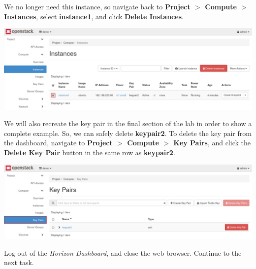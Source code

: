 \documentclass[letterpaper, 12pt]{article}
\begin{document}
\begin{enumerate}
    \begin{labstep}
        We no longer need this instance, so navigate back to \textbf{Project $>$ Compute $>$ Instances}, select \textbf{instance1}, and click \textbf{Delete Instances}.

        \begin{center}
            \includegraphics[width=\linewidth]{images/part8/step14.png}
        \end{center}
    \end{labstep}

    \begin{labstep}
        We will also recreate the key pair in the final section of the lab in order to show a complete example.
        So, we can safely delete \textbf{keypair2}.
        To delete the key pair from the dashboard, navigate to \textbf{Project $>$ Compute $>$ Key Pairs}, and click the \textbf{Delete Key Pair} button in the same row as \textbf{keypair2}.

        \begin{center}
            \includegraphics[width=\linewidth]{images/part8/step15.png}
        \end{center}
    \end{labstep}

    \begin{labstep}
        Log out of the \textit{Horizon Dashboard}, and close the web browser.
        Continue to the next task.
    \end{labstep}

\end{enumerate}

\end{document}
